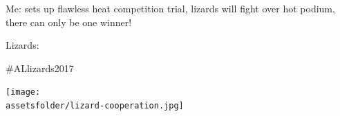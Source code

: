 \documentclass{beamer}
\newcommand{\assetsfolder}{./assets}
\begin{document}
    \begin{frame}
        \begin{center}
            \begin{tcolorbox}[colback=twitter,colframe=twitter!40!black,title=
                    \href{https://twitter.com/kirstyjean/status/870415613746962432}
                    {@kirstyjean} (2 Jun 2017):
]
                    Me: sets up flawless heat competition trial, lizards will
                    fight over hot podium, there can only be one winner!

                    Lizards:

                    \#ALlizards2017
           \end{tcolorbox}
        \end{center}
        \begin{center}
            \pause
            \texttt{[image: \\assetsfolder/lizard-cooperation.jpg]}
        \end{center}

    \end{frame}






\end{document}
